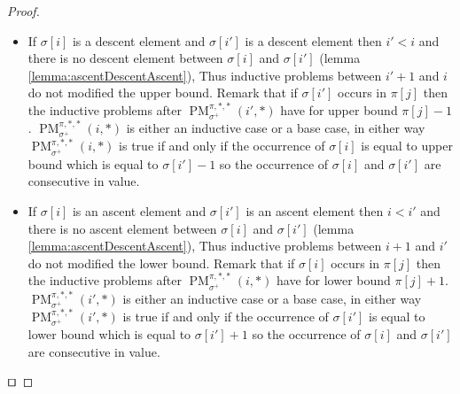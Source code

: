 \documentclass[a4paper]{llncs}
\newcommand{\ptext}{\pi}
\newcommand{\pmotif}{\sigma}
\newcommand{\pbmotif}{\pmotif^+}
\DeclareMathOperator{\PMa}{PM}
\newcommand{\PM}[6]{\PMa_{{#1}}^{{#2},{#3},{#4}}({#5},{#6})}
\begin{document}
\begin{proof}
\begin{itemize}
\begin{itemize}
			\item If $\pmotif[i]$ is a descent element and $\pmotif[i']$ is a descent element then $i'<i$ and there is no descent element between $\pmotif[i]$ and $\pmotif[i']$ (lemma \ref{lemma:ascentDescentAscent}), Thus inductive problems between $i'+1$ and $i$ do not modified the upper bound. Remark that if $\pmotif[i']$ occurs in $\ptext[j]$ then 
			the inductive problems after $\PM{\pbmotif}{\ptext}{*}{*}{i'}{*}$ have for upper bound $\ptext[j]-1$. $\PM{\pbmotif}{\ptext}{*}{*}{i}{*}$ is either an inductive case or a base case, in either way  $\PM{\pbmotif}{\ptext}{*}{*}{i}{*}$ is true if and only if the occurrence of $\sigma[i]$ is equal to upper bound which is equal to $\sigma[i']-1$ so the occurrence of $\pmotif[i]$ and $\pmotif[i']$ are consecutive in value.
			
			\item If $\pmotif[i]$ is an ascent element and $\pmotif[i']$ is an ascent element then $i<i'$ and there is no  ascent element between $\pmotif[i]$ and $\pmotif[i']$ (lemma \ref{lemma:ascentDescentAscent}), Thus inductive problems between $i+1$ and $i'$ do not modified the lower bound. Remark that if $\pmotif[i]$ occurs in $\ptext[j]$ then 
			the inductive problems after $\PM{\pbmotif}{\ptext}{*}{*}{i}{*}$ have for lower bound $\ptext[j]+1$. $\PM{\pbmotif}{\ptext}{*}{*}{i'}{*}$ is either an inductive case or a base case, in either way  $\PM{\pbmotif}{\ptext}{*}{*}{i'}{*}$ is true if and only if the occurrence of $\sigma[i']$ is equal to lower bound which is equal to $\sigma[i']+1$ so the occurrence of $\pmotif[i]$ and $\pmotif[i']$ are consecutive in value.
		\end{itemize}
	
	
	
	
	
	
	
\end{itemize}
$\qed$
\end{proof}
\end{document}
